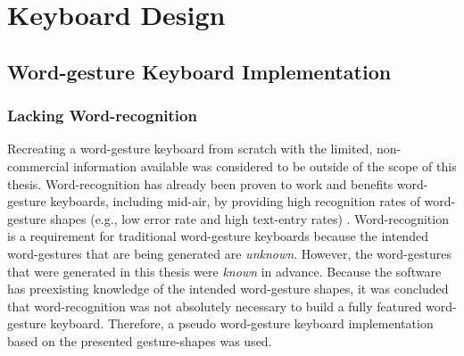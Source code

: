 \chapter{Keyboard Design} \label{keyboard_design}

\section{Word-gesture Keyboard Implementation}
\subsection{Lacking Word-recognition} \label{lacking_word_recognition}
Recreating a word-gesture keyboard from scratch with the limited, non-commercial information available was considered to be outside of the scope of this thesis. Word-recognition has already been proven to work and benefits word-gesture keyboards, including mid-air, by providing high recognition rates of word-gesture shapes (e.g., low error rate and high text-entry rates) \cite{ref_shape_writing,ref_the_word_gesture_keyboard,ref_shapewriter_iphone,ref_shark_wgk,ref_shorthand_writing,ref_vulture}. Word-recognition is a requirement for traditional word-gesture keyboards because the intended word-gestures that are being generated are \textit{unknown}. However, the word-gestures that were generated in this thesis were \textit{known} in advance. Because the software has preexisting knowledge of the intended word-gesture shapes, it was concluded that word-recognition was not absolutely necessary to build a fully featured word-gesture keyboard. Therefore, a pseudo word-gesture keyboard implementation based on the presented gesture-shapes was used.

